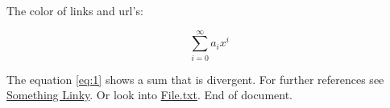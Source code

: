 \documentclass{article}
\begin{document}
The color of links and url's:

\begin{equation}
\label{eq:1}
\sum_{i=0}^{\infty} a_i x^i
\end{equation}

The equation \ref{eq:1}
shows a sum that is divergent.
For further references see
\href{http://www.overleaf.com}{Something  Linky}. 
Or look into
\href{run:./file.txt}{File.txt}.
End of document.
\end{document}
